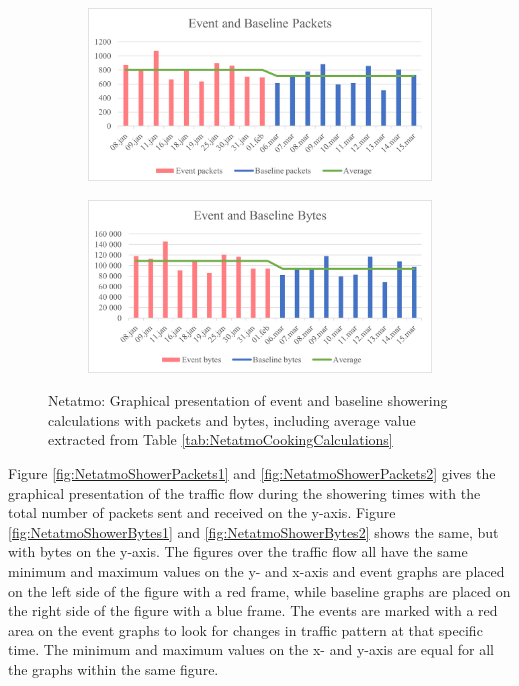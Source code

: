 \begin{figure}[H]
    \centering
    \begin{subfigure}{0.8\textwidth}
       \centering
       \includegraphics[width=1\hsize]{figures/Netatmo_Shower_Calculations_Packets.png} 
    \end{subfigure}
    \begin{subfigure}{0.8\textwidth}
        \centering
        \includegraphics[width=1\hsize]{figures/Netatmo_Shower_Calculations_Bytes.png} 
    \end{subfigure}
    \caption{Netatmo: Graphical presentation of event and baseline showering calculations with packets and bytes, including average value extracted from Table \ref{tab:NetatmoCookingCalculations}}
    \label{fig:NetatmoShowerCalculations}
\end{figure}

Figure \ref{fig:NetatmoShowerPackets1} and \ref{fig:NetatmoShowerPackets2} gives the graphical presentation of the traffic flow during the showering times with the total number of packets sent and received on the y-axis. Figure \ref{fig:NetatmoShowerBytes1} and \ref{fig:NetatmoShowerBytes2} shows the same, but with bytes on the y-axis. The figures over the traffic flow all have the same minimum and maximum values on the y- and x-axis and event graphs are placed on the left side of the figure with a red frame, while baseline graphs are placed on the right side of the figure with a blue frame. The events are marked with a red area on the event graphs to look for changes in traffic pattern at that specific time. The minimum and maximum values on the x- and y-axis are equal for all the graphs within the same figure. 

